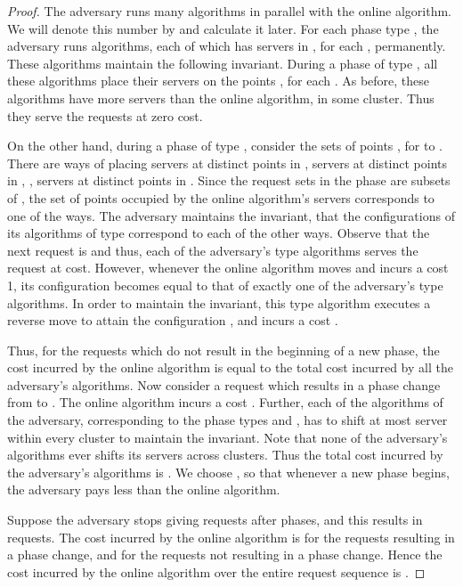 \documentclass[11pt]{article}
\theoremstyle{plain}\newtheorem{theorem}{Theorem}
\theoremstyle{definition}
\theoremstyle{remark}
\begin{document}
\begin{proof}
The adversary runs many algorithms in parallel with the online algorithm. We will denote this number by  and calculate it later. For each phase type , the adversary runs  algorithms, each of which has  servers in , for each , permanently. These algorithms maintain the following invariant. During a phase of type , all these  algorithms place their  servers on the points , for each . As before, these algorithms have more servers than the online algorithm, in some cluster. Thus they serve the requests at zero cost.

On the other hand, during a phase of type , consider the sets of points , for  to . There are  ways of placing  servers at distinct points in ,  servers at distinct points in , ,  servers at distinct points in . Since the request sets in the phase are subsets of , the set of points  occupied by the online algorithm's servers corresponds to one of the  ways. The adversary maintains the invariant, that the configurations of its  algorithms of type  correspond to each of the other ways. Observe that the next request is  and thus, each of the adversary's type  algorithms serves the request at  cost. However, whenever the online algorithm moves and incurs a cost 1, its configuration becomes equal to that of exactly one of the adversary's type  algorithms. In order to maintain the invariant, this type  algorithm executes a reverse move to attain the configuration , and incurs a cost .

Thus, for the requests which do not result in the beginning of a new phase, the cost incurred by the online algorithm is equal to the total cost incurred by all the adversary's algorithms. Now consider a request which results in a phase change from  to . The online algorithm incurs a cost . Further, each of the  algorithms of the adversary, corresponding to the phase types  and , has to shift at most  server within every cluster to maintain the invariant. Note that none of the adversary's algorithms ever shifts its servers across clusters. Thus the total cost incurred by the adversary's algorithms is . We choose , so that whenever a new phase begins, the adversary pays less than the online algorithm.

Suppose the adversary stops giving requests after  phases, and this results in  requests. The cost incurred by the online algorithm is  for the requests resulting in a phase change, and  for the requests not resulting in a phase change. Hence the cost incurred by the online algorithm over the entire request sequence is .


\end{proof}
\end{document}

